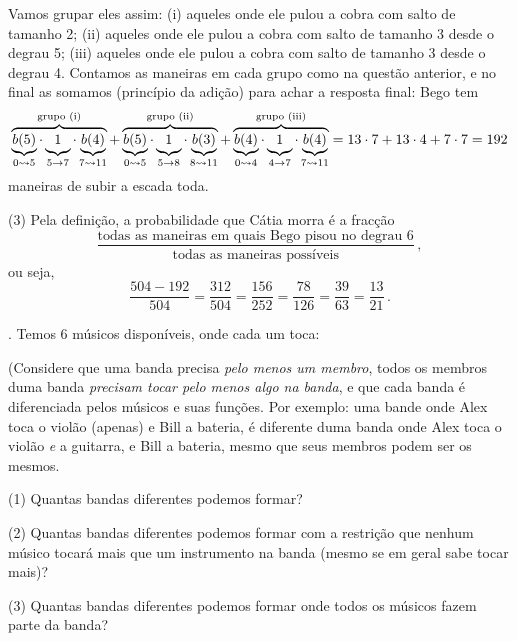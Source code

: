 Vamos grupar eles assim:
(i)   aqueles onde ele pulou a cobra com salto de tamanho 2;
(ii)  aqueles onde ele pulou a cobra com salto de tamanho 3 desde o degrau 5;
(iii) aqueles onde ele pulou a cobra com salto de tamanho 3 desde o degrau 4.
Contamos as maneiras em cada grupo como na questão anterior, e no final as somamos (princípio da adição) para achar a resposta final: Bego tem
$$
\overbrace{
\underbrace{b(5)}_{0 \transto 5} \ntimes
\underbrace{\phantom(1\phantom)}_{5 \to 7} \ntimes
\underbrace{b(4)}_{7 \transto 11}
}^{\text{grupo (i)}}
+
\overbrace{
\underbrace{b(5)}_{0 \transto 5} \ntimes
\underbrace{\phantom(1\phantom)}_{5 \to 8} \ntimes
\underbrace{b(3)}_{8 \transto 11}
}^{\text{grupo (ii)}}
+
\overbrace{
\underbrace{b(4)}_{0 \transto 4} \ntimes
\underbrace{\phantom(1\phantom)}_{4 \to 7} \ntimes
\underbrace{b(4)}_{7 \transto 11}
}^{\text{grupo (iii)}}
=
13 \ntimes 7 + 
13 \ntimes 4 + 
7 \ntimes 7 
=
192
$$
maneiras de subir a escada toda.
\item{(3)}
Pela definição, a probabilidade que Cátia morra é a fracção
$$
\frac
{\text{todas as maneiras em quais Bego pisou no degrau 6}}
{\text{todas as maneiras possíveis}}\,,
$$
ou seja,
$$
\frac
{504-192}
{504}
=
\frac
{312}
{504}
=
\frac
{156}
{252}
=
\frac
{78}
{126}
=
\frac
{39}
{63}
=
\frac
{13}
{21}
\,.
$$

\endproblem

\problem.
\label{band_maker}%
Temos $6$ músicos disponíveis, onde cada um toca:
\endgraf
{}

\noindent
(Considere que uma banda precisa \emph{pelo menos um membro},
todos os membros duma banda \emph{precisam tocar pelo menos algo na banda},
e que cada banda é diferenciada pelos músicos e
suas funções.
Por exemplo: uma bande onde Alex toca o violão (apenas) e Bill a bateria,
é diferente duma banda onde
Alex toca o violão \emph{e} a guitarra, e Bill a bateria,
mesmo que seus membros podem ser os mesmos.

\item{(1)}
Quantas bandas diferentes podemos formar?
\item{(2)}
Quantas bandas diferentes podemos formar com a restrição que nenhum
músico tocará mais que um instrumento na banda (mesmo se em geral sabe tocar mais)?
\item{(3)}
Quantas bandas diferentes podemos formar onde todos os
músicos fazem parte da banda?


